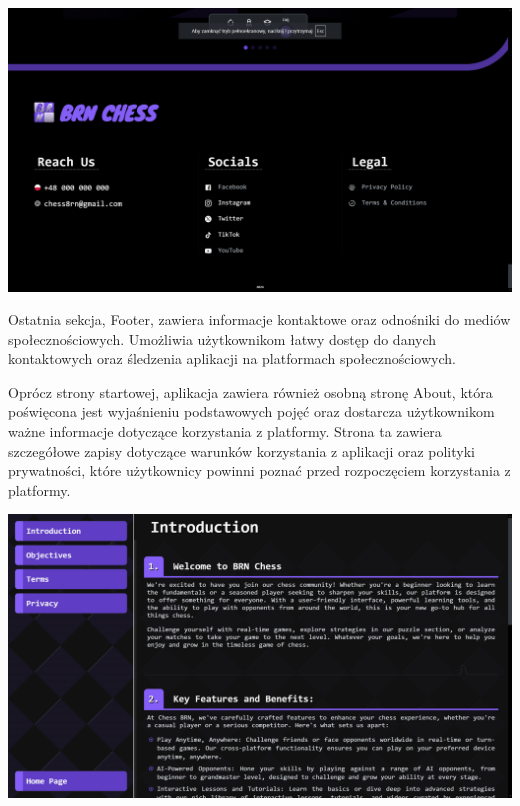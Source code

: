 \documentclass[12pt,a4paper]{article}
\begin{document}
\vspace{1cm}

\begin{minipage}[t]{0.3\textwidth} 
    \vspace{0pt} 
    \centering 
    \includegraphics[width=\linewidth]{images/ins_footer.png} 
\end{minipage} 
\hfill 
\begin{minipage}[t]{0.6\textwidth} 
    \vspace{0pt} 
    \raggedright 
    Ostatnia sekcja, Footer, zawiera informacje kontaktowe oraz odnośniki do mediów społecznościowych. Umożliwia użytkownikom łatwy dostęp do danych kontaktowych oraz śledzenia aplikacji na platformach społecznościowych.
\end{minipage}

\vspace{1cm}

\begin{minipage}[t]{0.6\textwidth} 
    \vspace{0pt} 
    \raggedright 
    Oprócz strony startowej, aplikacja zawiera również osobną stronę About, która poświęcona jest wyjaśnieniu podstawowych pojęć oraz dostarcza użytkownikom ważne informacje dotyczące korzystania z platformy. Strona ta zawiera szczegółowe zapisy dotyczące warunków korzystania z aplikacji oraz polityki prywatności, które użytkownicy powinni poznać przed rozpoczęciem korzystania z platformy.
\end{minipage}
\hfill 
\begin{minipage}[t]{0.3\textwidth} 
    \vspace{0pt} 
    \centering 
    \includegraphics[width=\linewidth]{images/ins_about.png} 
\end{minipage} 
\end{document}
